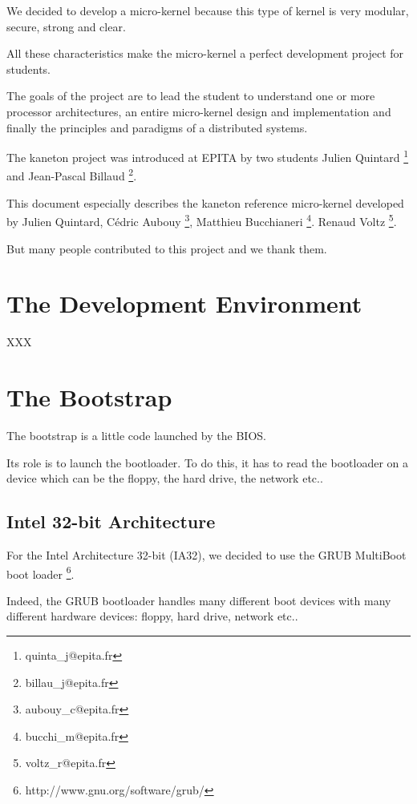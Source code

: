 We decided to develop a micro-kernel because this type of kernel is very
modular, secure, strong and clear.

All these characteristics make the micro-kernel a perfect development
project for students.

The goals of the project are to lead the student to understand one or more
processor architectures, an entire micro-kernel design and implementation
and finally the principles and paradigms of a distributed systems.

The kaneton project was introduced at EPITA by two students
	Julien Quintard
	  \footnote{quinta\_j@epita.fr} and
	Jean-Pascal Billaud
	  \footnote{billau\_j@epita.fr}.

This document especially describes the kaneton reference micro-kernel
developed by
	Julien Quintard,
	C\'edric Aubouy
	  \footnote{aubouy\_c@epita.fr},
	Matthieu Bucchianeri
	  \footnote{bucchi\_m@epita.fr}.
	Renaud Voltz
	  \footnote{voltz\_r@epita.fr}.

But many people contributed to this project and we thank them.



%
%

\section{The Development Environment}

XXX

%
%

%
%

\section{The Bootstrap}

The bootstrap is a little code launched by the BIOS.

Its role is to launch the bootloader. To do this, it has to read the
bootloader on a device which can be the floppy, the hard drive,
the network etc..

\subsection{Intel 32-bit Architecture}

For the Intel Architecture 32-bit (IA32), we decided to use the
	GRUB MultiBoot boot loader
	  \footnote{http://www.gnu.org/software/grub/}.

Indeed, the GRUB bootloader handles many different boot devices with
many different hardware devices: floppy, hard drive, network etc..

